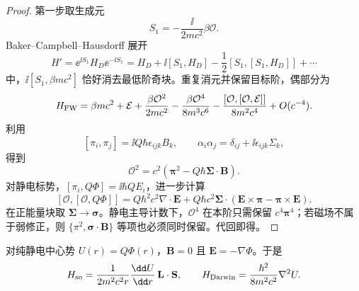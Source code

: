 \begin{proof}
第一步取生成元
\[
S_1=-\frac{\ii}{2mc^2}\beta\mathcal O.
\]
Baker--Campbell--Hausdorff 展开
\[
H'=
\ee^{\ii S_1}H_D\ee^{-\ii S_1}
=H_D+\ii[S_1,H_D]-\frac12[S_1,[S_1,H_D]]+\cdots
\]
中，$\ii[S_1,\beta mc^2]$ 恰好消去最低阶奇块。重复消元并保留目标阶，偶部分为
\begin{equation}
H_{\rm FW}
=\beta mc^2+\mathcal E
+\frac{\beta\mathcal O^2}{2mc^2}
-\frac{\beta\mathcal O^4}{8m^3c^6}
-\frac{[\mathcal O,[\mathcal O,\mathcal E]]}{8m^2c^4}
+O(c^{-4}).
\label{eq:fw-even-odd-master}
\end{equation}
利用
\[
[\pi_i,\pi_j]=\ii Q\hbar\epsilon_{ijk}B_k,
\qquad
\alpha_i\alpha_j=\delta_{ij}+\ii\epsilon_{ijk}\Sigma_k,
\]
得到
\[
\mathcal O^2
=c^2(\boldsymbol\pi^2-Q\hbar\boldsymbol\Sigma\cdot\mathbf B).
\]
对静电标势，$[\pi_i,Q\Phi]=\ii\hbar Q E_i$，进一步计算
\[
[\mathcal O,[\mathcal O,Q\Phi]]
=Q\hbar^2c^2\nabla\cdot\mathbf E
+Q\hbar c^2\boldsymbol\Sigma\cdot
(\mathbf E\times\boldsymbol\pi-\boldsymbol\pi\times\mathbf E).
\]
在正能量块取 $\boldsymbol\Sigma\to\boldsymbol\sigma$。静电主导计数下，$\mathcal O^4$ 在本阶只需保留 $c^4\boldsymbol\pi^4$；若磁场不属于弱修正，则 $\{\pi^2,\boldsymbol\sigma\cdot\mathbf B\}$ 等项也必须同时保留。代回即得。
\end{proof}

对纯静电中心势 $U(r)=Q\Phi(r)$，$\mathbf B=0$ 且 $\mathbf E=-\nabla\Phi$。于是
\begin{equation}
H_{\rm so}
=\frac{1}{2m^2c^2r}\frac{\dd U}{\dd r}\,\mathbf L\cdot\mathbf S,
\qquad
H_{\rm Darwin}
=\frac{\hbar^2}{8m^2c^2}\nabla^2U.
\label{eq:pauli-from-dirac}
\end{equation}

